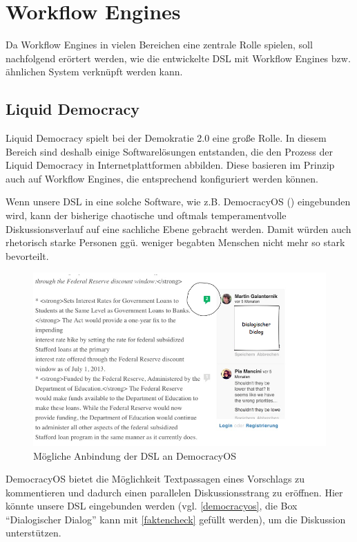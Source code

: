 \documentclass[11pt,a4paper,bibtotocnumbered]{scrreprt}
\begin{document}
\section{Workflow Engines} %

Da Workflow Engines in vielen Bereichen eine zentrale Rolle spielen, soll nachfolgend erörtert werden, wie die entwickelte \ac{DSL} mit Workflow Engines bzw. ähnlichen System verknüpft werden kann.

\subsection{Liquid Democracy} %

Liquid Democracy spielt bei der Demokratie 2.0 eine große Rolle. 
In diesem Bereich sind deshalb einige Softwarelösungen entstanden, die den Prozess der Liquid Democracy in Internetplattformen abbilden.
Diese basieren im Prinzip auch auf Workflow Engines, die entsprechend konfiguriert werden können.

Wenn unsere \ac{DSL} in eine solche Software, wie z.B. DemocracyOS (\cite{DemocracyOS}) eingebunden wird, kann der bisherige chaotische und oftmals temperamentvolle Diskussionsverlauf auf eine sachliche Ebene gebracht werden.
Damit würden auch rhetorisch starke Personen ggü. weniger begabten Menschen nicht mehr so stark bevorteilt.

\begin{figure}[htbp]
\centering
\includegraphics[width=1\textwidth]{img/democracyos.png}
\caption{Mögliche Anbindung der DSL an DemocracyOS}
\label{democracyos}
\end{figure}

DemocracyOS bietet die Möglichkeit Textpassagen eines Vorschlags zu kommentieren und dadurch einen parallelen Diskussionsstrang zu eröffnen. 
Hier könnte unsere \ac{DSL} eingebunden werden (vgl. \autoref{democracyos}, die Box \enquote{Dialogischer Dialog} kann  mit \autoref{faktencheck} gefüllt werden), um die Diskussion unterstützen.
\end{document}
